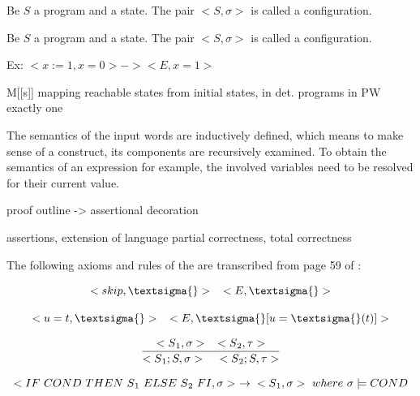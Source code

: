 \begin{definition}
	Be $S$ a program and \textsigma{} a state. The pair $<S,\sigma{}>$ is called a configuration.
\end{definition}

\begin{definition}
	Be $S$ a program and \textsigma{} a state. The pair $<S,\sigma{}>$ is called a configuration.
\end{definition}

Ex: $<x:=1,x=0> -> <E,x=1>$

\begin{definition}
	M[[s]] mapping reachable states from initial states, in det. programs in PW exactly one
\end{definition}

The semantics of the input words are inductively defined, which means to make sense of a construct, its components are recursively examined. To obtain the semantics of an expression for example, the involved variables need to be resolved for their current value.

proof outline -> assertional decoration

assertions, extension of language
partial correctness, total correctness

The following axioms and rules of the  are transcribed from page 59 of \cite{apt2010verification}:

\begin{equation}\label{eq:conf_skip}
	<skip,\textsigma{}>\mathspace \rightarrow{} <E,\textsigma{}>
\end{equation}

\begin{equation}\label{eq:conf_assign}
	<u=t,\textsigma{}>\mathspace \rightarrow{} <E,\textsigma{}[u=\textsigma{}(t)]>
\end{equation}

\begin{equation}\label{eq:conf_comp}
	\dfrac{<S\textsubscript{1},\sigma{}>\;\;{} <S\textsubscript{2},\tau>}{<S\textsubscript{1};S,\sigma{}>\;\;{}\ <S\textsubscript{2};S,\tau{}>}
\end{equation}

\begin{equation}\label{eq:conf_altThen}
	<IF\ COND\ THEN\ S\textsubscript{1}\ ELSE\ S\textsubscript{2}\ FI,\sigma{}>\ \rightarrow{} <S\textsubscript{1},\sigma{}>\ where\ \sigma{} \models{} COND
\end{equation}

